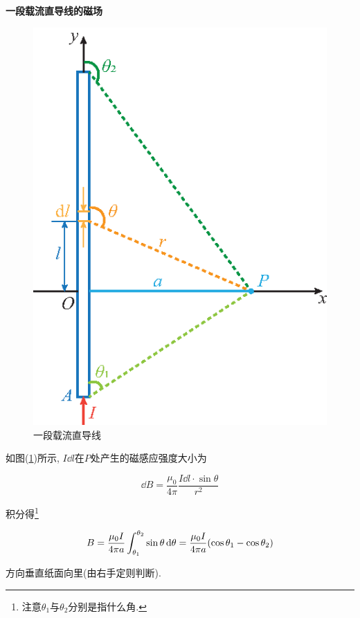 \begin{example}
	\textbf{一段载流直导线的磁场}
	
	\begin{figure}[H]
		\centering
		\includegraphics[scale=0.7]{C8-fig3.eps}
		\caption{一段载流直导线}
		\label{C8-fig3}
	\end{figure}
	
	\begin{solution}
		
		如图(\ref{C8-fig3})所示, $I\dd{l}$在$P$处产生的磁感应强度大小为
		
		\begin{equation*}
			\dd{B} = \dfrac{\mu_0}{4 \pi} \dfrac{I \dd{l} \cdot \sin \theta}{r^2}
		\end{equation*}
	
		积分得\footnote{注意$\theta_1$与$\theta_2$分别是指什么角. }
		
		\begin{equation*}
			B = \dfrac{\mu_0 I}{4 \pi a} \int_{\theta_1}^{\theta_2} \sin \theta \dd{\theta} = \dfrac{\mu_0 I}{4 \pi a} \qty(\cos \theta_1 - \cos \theta_2)
		\end{equation*}
		
		方向垂直纸面向里(由右手定则判断).
		
	\end{solution}
	
\end{example}

